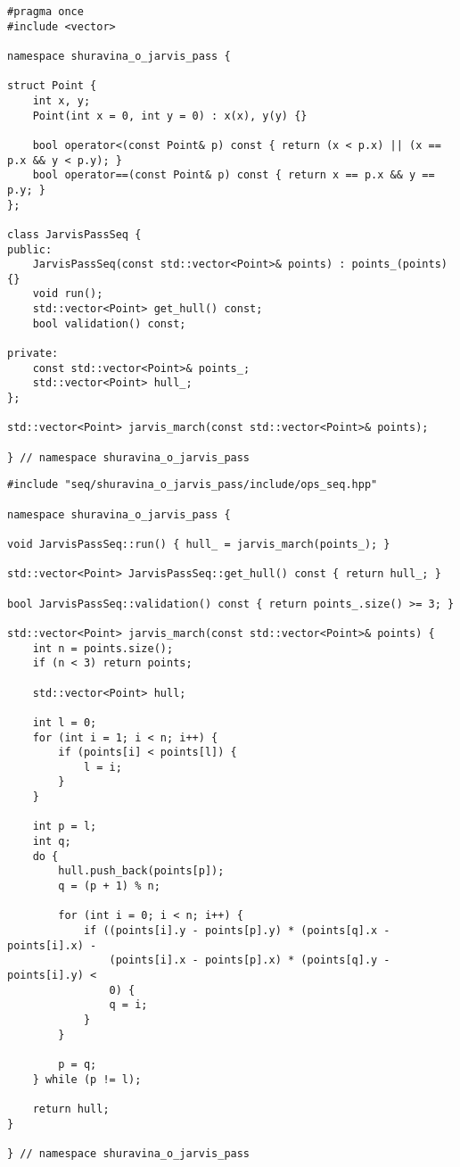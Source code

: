 \documentclass[12pt]{article}
\begin{document}
\newpage

\begin{lstlisting}[caption={ops\_seq\_.hpp}]
#pragma once
#include <vector>

namespace shuravina_o_jarvis_pass {

struct Point {
    int x, y;
    Point(int x = 0, int y = 0) : x(x), y(y) {}

    bool operator<(const Point& p) const { return (x < p.x) || (x == p.x && y < p.y); }
    bool operator==(const Point& p) const { return x == p.x && y == p.y; }
};

class JarvisPassSeq {
public:
    JarvisPassSeq(const std::vector<Point>& points) : points_(points) {}
    void run();
    std::vector<Point> get_hull() const;
    bool validation() const;

private:
    const std::vector<Point>& points_;
    std::vector<Point> hull_;
};

std::vector<Point> jarvis_march(const std::vector<Point>& points);

} // namespace shuravina_o_jarvis_pass
\end{lstlisting}

\newpage

\begin{lstlisting}[caption={ops\_seq\_.cpp}]
#include "seq/shuravina_o_jarvis_pass/include/ops_seq.hpp"

namespace shuravina_o_jarvis_pass {

void JarvisPassSeq::run() { hull_ = jarvis_march(points_); }

std::vector<Point> JarvisPassSeq::get_hull() const { return hull_; }

bool JarvisPassSeq::validation() const { return points_.size() >= 3; }

std::vector<Point> jarvis_march(const std::vector<Point>& points) {
    int n = points.size();
    if (n < 3) return points;

    std::vector<Point> hull;

    int l = 0;
    for (int i = 1; i < n; i++) {
        if (points[i] < points[l]) {
            l = i;
        }
    }

    int p = l;
    int q;
    do {
        hull.push_back(points[p]);
        q = (p + 1) % n;

        for (int i = 0; i < n; i++) {
            if ((points[i].y - points[p].y) * (points[q].x - points[i].x) -
                (points[i].x - points[p].x) * (points[q].y - points[i].y) <
                0) {
                q = i;
            }
        }

        p = q;
    } while (p != l);

    return hull;
}

} // namespace shuravina_o_jarvis_pass
\end{lstlisting}
\end{document}

